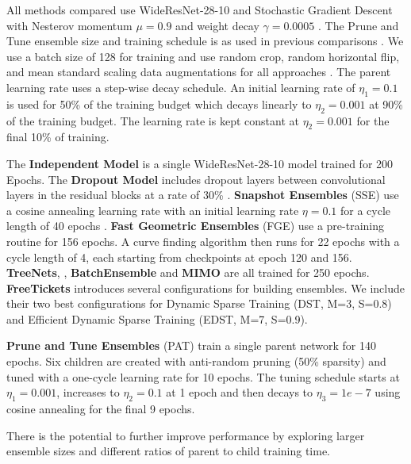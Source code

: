 \documentclass[letterpaper]{article} %
\begin{document}
All methods compared use WideResNet-28-10 and Stochastic Gradient Descent with Nesterov momentum $\mu=0.9$ and weight decay $\gamma=0.0005$ \cite{sutskever13nesterov}. The Prune and Tune ensemble size and training schedule is as used in previous comparisons \cite{wasay2020mothernets, garipov2018loss}.  We use a batch size of 128 for training and use random crop, random horizontal flip, and mean standard scaling data augmentations for all approaches \cite{garipov2018loss, havasi2021training, liu2021freetickets, huang2017snapshot}. The parent learning rate uses a step-wise decay schedule. An initial learning rate of $\eta_1=0.1$ is used for 50\% of the training budget which decays linearly to $\eta_2=0.001$ at 90\% of the training budget. The learning rate is kept constant at $\eta_2=0.001$ for the final 10\% of training.

The {\bf Independent Model} is a single WideResNet-28-10 model trained for 200 Epochs. The {\bf Dropout Model} includes dropout layers between convolutional layers in the residual blocks at a rate of 30\% \cite{zagoruyko2017wide}. {\bf Snapshot Ensembles} (SSE) use a cosine annealing learning rate with an initial learning rate $\eta = 0.1$ for a cycle length of 40 epochs \cite{huang2017snapshot}. {\bf Fast Geometric Ensembles} (FGE) use a pre-training routine for 156 epochs. A curve finding algorithm then runs for 22 epochs with a cycle length of 4, each starting from checkpoints at epoch 120 and 156. {\bf TreeNets}, \cite{lee2015m}, {\bf BatchEnsemble} \cite{wen2020batchensemble} and {\bf MIMO} \cite{havasi2021training} are all trained for 250 epochs. {\bf FreeTickets} introduces several configurations for building ensembles. We include their two best configurations for Dynamic Sparse Training (DST, M=3, S=0.8) and Efficient Dynamic Sparse Training (EDST, M=7, S=0.9).

{\bf Prune and Tune Ensembles} (PAT) train a single parent network for 140 epochs. Six children are created with anti-random pruning (50\% sparsity) and tuned with a one-cycle learning rate for 10 epochs. The tuning schedule starts at $\eta_1=0.001$, increases to $\eta_2=0.1$ at 1 epoch and then decays to $\eta_3=1e-7$ using cosine annealing for the final 9 epochs.

There is the potential to further improve performance by exploring larger ensemble sizes and different ratios of parent to child training time.
\end{document}
